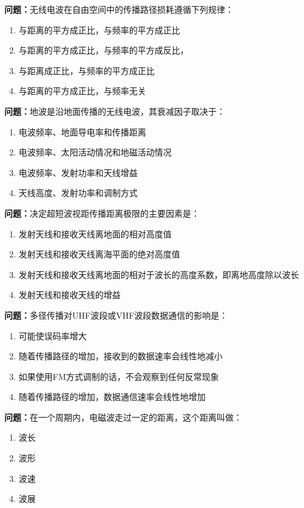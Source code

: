 \documentclass{ctexbook}
\begin{document}
\textbf{问题：}无线电波在自由空间中的传播路径损耗遵循下列规律：
\begin{enumerate}[label=\Alph*), leftmargin=3em]
\item 与距离的平方成正比，与频率的平方成正比
\item 与距离的平方成正比，与频率的平方成反比，
\item 与距离成正比，与频率的平方成正比
\item 与距离的平方成正比，与频率无关
\end{enumerate}

\textbf{问题：}地波是沿地面传播的无线电波，其衰减因子取决于：
\begin{enumerate}[label=\Alph*), leftmargin=3em]
\item 电波频率、地面导电率和传播距离
\item 电波频率、太阳活动情况和地磁活动情况
\item 电波频率、发射功率和天线增益
\item 天线高度、发射功率和调制方式
\end{enumerate}

\textbf{问题：}决定超短波视距传播距离极限的主要因素是：
\begin{enumerate}[label=\Alph*), leftmargin=3em]
\item 发射天线和接收天线离地面的相对高度值
\item 发射天线和接收天线离海平面的绝对高度值
\item 发射天线和接收天线离地面的相对于波长的高度系数，即离地高度除以波长
\item 发射天线和接收天线的增益
\end{enumerate}

\textbf{问题：}多径传播对UHF波段或VHF波段数据通信的影响是：
\begin{enumerate}[label=\Alph*), leftmargin=3em]
\item 可能使误码率增大
\item 随着传播路径的增加，接收到的数据速率会线性地减小
\item 如果使用FM方式调制的话，不会观察到任何反常现象
\item 随着传播路径的增加，数据通信速率会线性地增加
\end{enumerate}

\textbf{问题：}在一个周期内，电磁波走过一定的距离，这个距离叫做：
\begin{enumerate}[label=\Alph*), leftmargin=3em]
\item 波长
\item 波形
\item 波速
\item 波展
\end{enumerate}
\end{document}
